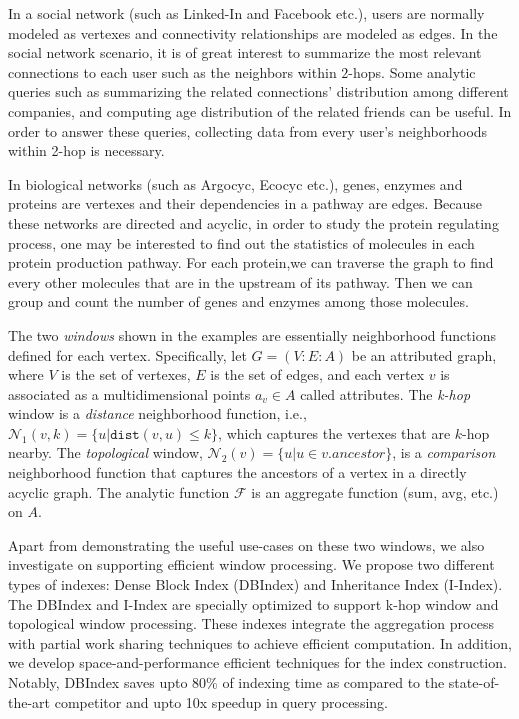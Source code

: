 \begin{example}
In a social network (such as Linked-In and Facebook etc.), users are normally modeled as vertexes and connectivity relationships are modeled as edges. In the social network scenario, it is of great interest to summarize the most relevant connections to each user such as the neighbors within $2$-hops. Some analytic queries such as summarizing the related connections' distribution among different companies, and computing age distribution of the related friends can be useful. In order to answer these queries, collecting data from every user's neighborhoods within 2-hop is necessary.
\end{example}
\begin{example}
In biological networks (such as Argocyc, Ecocyc etc.), genes, enzymes and proteins are vertexes and their
dependencies in a pathway are edges. Because these networks are directed and acyclic, 
in order to study the protein regulating process, one may be interested to find out the statistics of molecules in each protein production pathway. For each protein,we can traverse the 
graph to find every other molecules that are in the upstream of its pathway.
Then we can group and count the number of genes and enzymes among those molecules.
\end{example}

The two \emph{windows} shown in the examples are essentially neighborhood functions defined for each vertex. Specifically, let $G=(V:E:A)$ be an attributed graph, where $V$ is the set of vertexes, $E$ is the set of edges, and each vertex $v$ is associated as a multidimensional points $a_v \in A$ called attributes.
The \emph{k-hop} window is a \emph{distance} neighborhood function, 
i.e., $\mathcal{N}_1(v,k)= \{u|\mathtt{dist}(v,u) \leq k\}$, 
which captures the vertexes that are $k$-hop nearby. 
The \emph{topological} window,  $\mathcal{N}_2(v)= \{u | u \in v.ancestor\}$,
is a \emph{comparison} neighborhood function that captures
the ancestors of a vertex in a directly acyclic graph.  The analytic function $\mathcal{F}$ is an aggregate function (sum, avg, etc.) on $A$.

Apart from demonstrating the useful use-cases on these two windows, 
we also investigate on supporting efficient window processing.  We propose
two different types of indexes: Dense Block Index (DBIndex)
and Inheritance Index (I-Index). The DBIndex and I-Index
are specially optimized to support k-hop window and topological
window processing. These indexes
integrate the aggregation process with partial work sharing techniques
to achieve efficient computation.
In addition, we develop space-and-performance efficient techniques
for the index construction. Notably, DBIndex saves upto 80\%
of indexing time as compared to the state-of-the-art competitor and upto 10x
speedup in query processing. 


